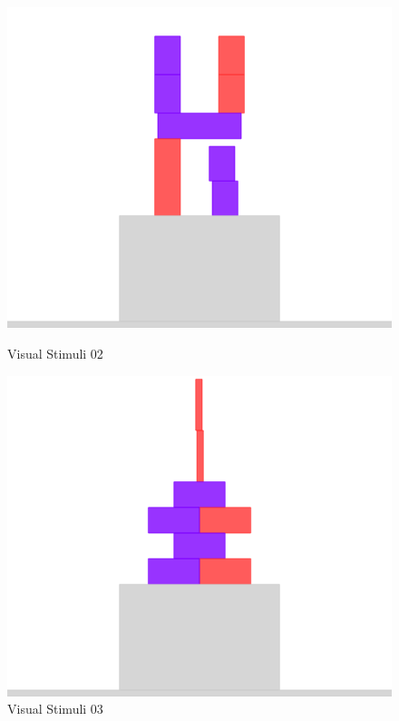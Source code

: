 \documentclass[10pt,letterpaper]{article}
\begin{document}
\begin{figure}[h]
    \parbox{.47\linewidth}{
        \centering
        \includegraphics[scale=0.3]{images/ensemble2.png}
        \caption{Visual Stimuli 02}
        \label{table:llama70B-fixed-deceiver-correlation}
    }
    \hfill
    \parbox{.47\linewidth}{
        \centering
        \includegraphics[scale=0.3]{images/ensemble3.png}
        \caption{Visual Stimuli 03}
        \label{table:gpt35-fixed-deceiver-correlation}
    }
\end{figure}
\end{document}
